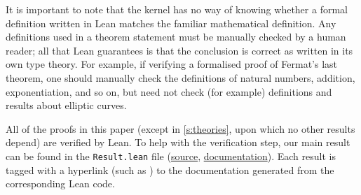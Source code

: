 It is important to note that the kernel has no way of knowing whether a formal definition written in Lean matches the familiar mathematical definition.
Any definitions used in a theorem statement must be manually checked by a human reader; all that Lean guarantees is that the conclusion is correct as written in its own type theory.
For example, if verifying a formalised proof of Fermat's last theorem, one should manually check the definitions of natural numbers, addition, exponentiation, and so on, but need not check (for example) definitions and results about elliptic curves.

All of the proofs in this paper (except in \cref{s:theories}, upon which no other results depend) are verified by Lean.
To help with the verification step, our main result can be found in the \texttt{Result.lean} file (\href{https://github.com/leanprover-community/con-nf/blob/main/ConNF/Model/Result.lean}{source}, \href{https://leanprover-community.github.io/con-nf/doc/ConNF/Model/Result.html}{documentation}).
Each result is tagged with a hyperlink (such as ) to the documentation generated from the corresponding Lean code.
